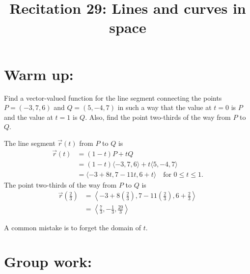 \documentclass[handout]{ximera}
\title{Recitation 29: Lines and curves in space}
\begin{document}
\begin{abstract}		\end{abstract}
\maketitle



\section{Warm up:}
Find a vector-valued function for the line segment connecting the points $P = (-3,7,6)$ and $Q = (5,-4,7)$ in such a way that the value at $t=0$ is $P$ and the value at $t=1$ is $Q$.  
Also, find the point two-thirds of the way from $P$ to $Q$.
	\begin{freeResponse}
	The line segment $\vec{r}(t)$ from $P$ to $Q$ is 
		\begin{align*}
		\vec{r}(t) &= (1-t)P + tQ  \\
		&= (1-t) \langle -3,7,6 \rangle + t \langle 5,-4,7 \rangle  \\
		&= \boxed{\langle -3 + 8t, 7 - 11t, 6 + t \rangle \quad \text{for }0 \leq t \leq 1}.
		\end{align*}
	The point two-thirds of the way from $P$ to $Q$ is
		\begin{align*}
		\vec{r} \left( \frac{2}{3} \right)
		&= \left\langle -3 + 8 \left( \frac{2}{3} \right), 7 - 11\left( \frac{2}{3} \right), 6 + \frac{2}{3} \right\rangle  \\
		&= \boxed{\left\langle \frac{7}{3} , - \frac{1}{3}, \frac{20}{3} \right\rangle}
		\end{align*}
	\end{freeResponse}
	
\begin{instructorNotes}
A common mistake is to forget the domain of $t$. 
\end{instructorNotes}







\section{Group work:}
\end{document}
